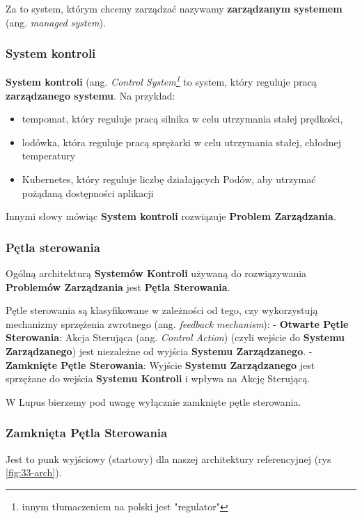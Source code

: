 Za to system, którym chcemy zarządzać nazywamy \textbf{zarządzanym systemem} (ang. \textit{managed system}). 

\subsubsection{System kontroli}

\textbf{System kontroli} (ang. \textit{Control System\footnote{innym tłumaczeniem na polski jest "regulator"}} to system, który reguluje pracą \textbf{zarządzanego systemu}. Na przykład:
\begin{itemize}
    \item tempomat, który reguluje pracą silnika w celu utrzymania stałej prędkości,
    \item lodówka, która reguluje pracą sprężarki w celu utrzymania stałej, chłodnej temperatury
    \item Kubernetes, który reguluje liczbę działających Podów, aby utrzymać pożądaną dostępności aplikacji
\end{itemize}

Innymi słowy mówiąc \textbf{System kontroli} rozwiązuje \textbf{Problem Zarządzania}.

\subsubsection{Pętla sterowania}

Ogólną architekturą \textbf{Systemów Kontroli} używaną do rozwiązywania \textbf{Problemów Zarządzania} jest \textbf{Pętla Sterowania}.

Pętle sterowania są klasyfikowane w zależności od tego, czy wykorzystują mechanizmy sprzężenia zwrotnego (ang. \textit{feedback mechanism}):
- \textbf{Otwarte Pętle Sterowania}: Akcja Sterująca (ang. \textit{Control Action}) (czyli wejście do \textbf{Systemu Zarządzanego}) jest niezależne od wyjścia \textbf{Systemu Zarządzanego}.
- \textbf{Zamknięte Pętle Sterowania}: Wyjście \textbf{Systemu Zarządzanego} jest sprzężane do wejścia \textbf{Systemu Kontroli} i wpływa na Akcję Sterującą. 

W Lupus bierzemy pod uwagę wyłącznie zamknięte pętle sterowania.

\subsubsection{Zamknięta Pętla Sterowania}

Jest to punk wyjściowy (startowy) dla naszej architektury referencyjnej (rys \ref{fig:33-arch}).

